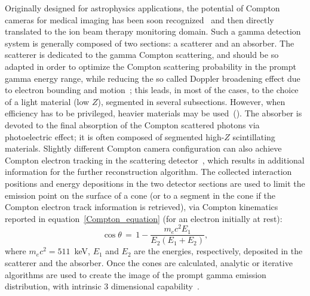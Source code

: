 Originally designed for astrophysics applications, the potential of Compton cameras for medical imaging has been soon recognized~\cite{TODD:1974aa} and then directly translated to the ion beam therapy monitoring domain. Such a gamma detection system is generally  composed of two sections: a scatterer and an absorber. The scatterer is dedicated to the gamma Compton scattering, and should be so adapted in order to optimize the Compton scattering probability in the prompt gamma energy range, while reducing the so called Doppler broadening effect due to electron bounding and motion~\cite{Doppler}; this leads, in most of the cases, to the choice of a light material (low $Z$), segmented in several subsections. However, when efficiency has to be privileged, heavier materials may be used~(\cite{Solevi:2016aa, ALDAWOOD2017190, 0031-9155-60-18-7085}). The absorber is devoted to the final absorption of the Compton scattered photons via photoelectric effect; it is often composed of segmented high-$Z$ scintillating materials. Slightly different Compton camera configuration can also achieve Compton electron tracking in the scattering detector~\cite{Frandes_2010, Yoshihara_ETCC}, which results in additional information for the further reconstruction algorithm.
 The collected interaction positions and energy depositions in the two detector sections are used to limit the emission point on the surface of a cone (or to a segment in the cone if the Compton electron track information is retrieved), via Compton kinematics reported in equation~\ref{Compton_equation} (for an electron initially at rest):
\begin{equation}
\cos\theta\,=\,1-\frac{m_{e}c^{2}E_{1}}{E_{2}(E_{1}+E_{2})},
\label{Compton_equation}
\end{equation} 
where \(m_{e}c^{2} = 511\)~keV, \(E_{1}\) and \(E_{2}\) are the energies, respectively, deposited in the scatterer and the absorber. 
Once the cones are calculated, analytic or iterative algorithms are used to create the image of the prompt gamma emission distribution, with intrinsic 3 dimensional capability~\cite{McKisson3D, Kuchment:2016uiw}. 


